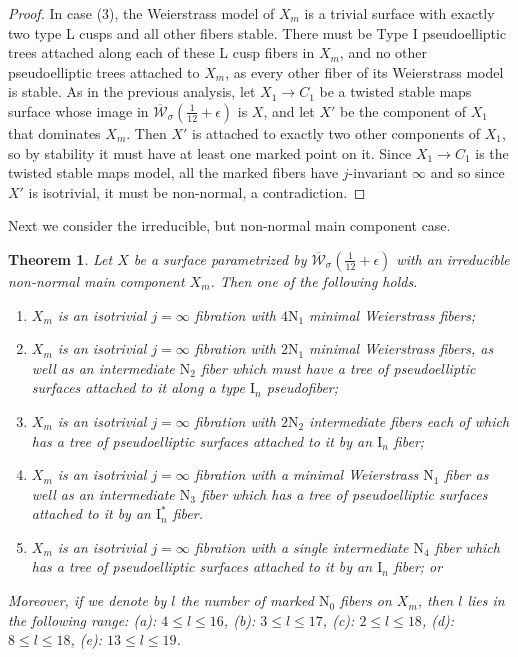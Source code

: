 \documentclass[11pt]{amsart}
\newtheorem{theorem}{Theorem}[section]
\theoremstyle{definition}
\theoremstyle{remark}
\newcommand{\calW}{\mathcal W}
\newcommand{\ktwelve}{\overline{\calW}_\sigma({\frac{1}{12}+\epsilon})}
\begin{document}
\begin{proof}
		In case (3), the Weierstrass model of $X_m$ is a trivial surface with exactly two type L cusps and all other fibers stable. There must be Type $\mathrm{I}$ pseudoelliptic trees attached along each of these L cusp fibers in $X_m$, and no other pseudoelliptic trees attached to $X_m$, as every other fiber of its Weierstrass model is stable. As in the previous analysis, let $X_1 \to C_1$ be a twisted stable maps surface whose image in $\ktwelve$ is $X$, and let $X'$ be the component of $X_1$ that dominates $X_m$. Then $X'$ is attached to exactly two other components of $X_1$, so by stability it must have at least one marked point on it. Since $X_1 \to C_1$ is the twisted stable maps model, all the marked fibers have $j$-invariant $\infty$ and so since $X'$ is isotrivial, it must be non-normal, a contradiction. 
	\end{proof} 
	
	Next we consider the irreducible, but non-normal main component case. 
	
	
	\begin{theorem}\label{thm:singlejinfty} Let $X$ be a surface parametrized by $\ktwelve$ with an irreducible non-normal main component $X_m$. Then one of the following holds. 
		
		\begin{enumerate}
			\item[(a)] $X_m$ is an isotrivial $j = \infty$ fibration with $4\mathrm{N}_1$ minimal Weierstrass fibers;
			\item[(b)] $X_m$ is an isotrivial $j = \infty$ fibration with $2\mathrm{N}_1$ minimal Weierstrass fibers, as well as an intermediate $\mathrm{N}_2$ fiber which must have a tree of pseudoelliptic surfaces attached to it along a type $\mathrm{I}_n$ pseudofiber;
			\item[(c)] $X_m$ is an isotrivial $j = \infty$ fibration with $2\mathrm{N}_2$ intermediate fibers each of which has a tree of pseudoelliptic surfaces attached to it by an $\mathrm{I}_n$ fiber;
			\item[(d)]$X_m$ is an isotrivial $j = \infty$ fibration with a minimal Weierstrass $\mathrm{N}_1$ fiber as well as an intermediate $\mathrm{N}_3$ fiber which has a tree of pseudoelliptic surfaces attached to it by an $\mathrm{I}_n^*$ fiber.  
			\item[(e)]$X_m$ is an isotrivial $j = \infty$ fibration with a single intermediate $\mathrm{N}_4$ fiber which has a tree of pseudoelliptic surfaces attached to it by an $\mathrm{I}_n$ fiber; or
		\end{enumerate}
		\noindent 
		
		Moreover, if we denote by $l$ the number of marked $\mathrm{N}_0$ fibers on $X_m$, then $l$ lies in the following range: (a): $4 \le l \le 16$, (b): $3 \le l \le 17$, (c): $2 \le l \le 18$, (d): $8 \le l \le 18$, (e): $13 \le l \le 19$.
	\end{theorem}
	
\end{document}
